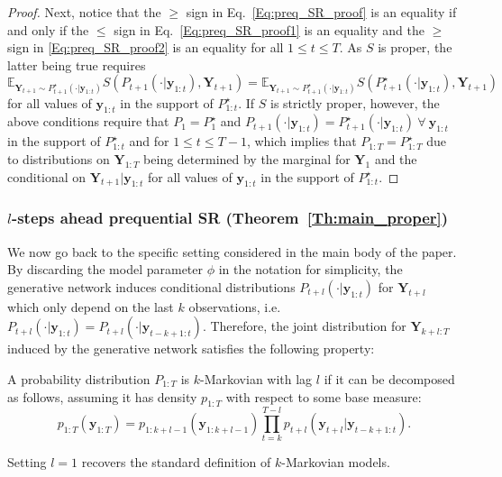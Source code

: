 \documentclass[twoside,11pt]{article}
\newcommand{\E}{\mathbb{E}}
\newcommand{\ddobs}{\mathbf{y}}
\newcommand{\Ddobs}{\mathbf{Y}}
\newcommand{\ddobsuptminus}{\mathbf{y}_{t-k+1:t}}
\newcommand{\ddobsupt}{\mathbf{y}_{1:t}}
\begin{document}
\begin{proof}
		Next, notice that the $ \ge $ sign in Eq.~\eqref{Eq:preq_SR_proof} is an equality if and only if the $ \le $ sign in Eq.~\eqref{Eq:preq_SR_proof1} is an equality and the $ \ge $ sign in \eqref{Eq:preq_SR_proof2} is an equality for all $ 1\le t\le T $. As $ S $ is proper, the latter being true requires $$ \E_{\Ddobs_{t+1}\sim P^\star_{t+1}(\cdot|\ddobs_{1:t})}  S(P_{t+1}(\cdot|\ddobsupt), \Ddobs_{t+1}) = \E_{\Ddobs_{t+1}\sim P^\star_{t+1}(\cdot|\ddobs_{1:t})}  S(P^\star_{t+1}(\cdot|\ddobsupt), \Ddobs_{t+1})$$ for all values of $ \ddobs_{1:t} $ in the support of $ P^\star_{1:t} $. If $ S $ is strictly proper, however, the above conditions require that $ P_1=P_1^\star $ and $ P_{t+1}(\cdot|\ddobsupt)=P^\star_{t+1}(\cdot|\ddobsupt) \ \forall\ \ddobsupt $ in the support of $ P^\star_{1:t} $ and for $  1\le t\le T-1  $, which implies that $ P_{1:T} = P^\star_{1:T} $ due to distributions on $ \Ddobs_{1:T} $ being determined by the marginal for $ \Ddobs_1 $ and the conditional on $ \Ddobs_{t+1}|\ddobs_{1:t} $ for all values of $ \ddobs_{1:t} $ in the support of $ P^\star_{1:t} $. \end{proof}
	
	
	\subsubsection{$ l $-steps ahead prequential SR (Theorem~\ref{Th:main_proper})}\label{app:proper_preq_l}
	We now go back to the specific setting considered in the main body of the paper. 
	By discarding the model parameter $ \phi $ in the notation for simplicity, the generative network induces conditional distributions $ P_{t+l}(\cdot|\ddobs_{1:t}) $ for $ \Ddobs_{t+l} $ which only depend on the last $ k $ observations, i.e. $ P_{t+l}(\cdot|\ddobsupt) =P_{t+l}(\cdot|\ddobsuptminus) $. Therefore, the joint distribution for $ \Ddobs_{k+l:T} $ induced by the generative network satisfies the following property:
	\begin{definition}\label{def:k-markov_lag_l}
		A probability distribution $ P_{1:T} $ is $ k $-Markovian with lag $ l $ if it can be decomposed as follows, assuming it has density $ p_{1:T} $ with respect to some base measure: 
		\begin{equation}\label{Eq:kMarkov-lag-l}
		p_{1:T}(\ddobs_{1:T}) = p_{1:k+l-1}(\ddobs_{1:k+l-1})\prod_{t=k}^{T-l}p_{t+l}(\ddobs_{t+l}|\ddobs_{{t-k+1}:t}).
		\end{equation}
	\end{definition}
	Setting $ l=1 $ recovers the standard definition of $ k $-Markovian models.	
	
\end{document}
